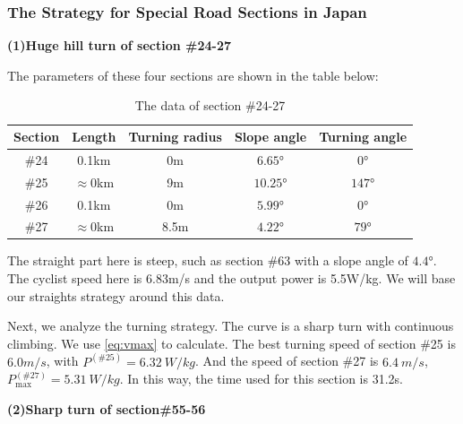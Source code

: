 \documentclass{mcmthesis}
\begin{document}
\subsubsection{The Strategy for Special Road Sections in Japan}
\label{sec:special-road-japan}
\textbf{(1)Huge hill turn of section \#24-27}


The parameters of these four sections are shown in the table below:
\begin{table}[H]
\centering
\caption{The data of section \#24-27}
\vspace{-0.4cm}
\begin{tabular}{ccccc}
\hline
Section & Length & Turning radius & Slope angle & Turning angle \\
\hline
\#24 & 0.1km & 0m & $6.65°$ & $0°$ \\
\#25 & $\approx 0$km & 9m & $10.25°$ & $147°$ \\
\#26 & 0.1km & 0m & $5.99°$ & $0°$ \\
\#27 & $\approx 0$km & 8.5m & $4.22°$ & $79°$ \\
\hline
\end{tabular}
\end{table}
\vspace{-0.4cm}
The straight part here is steep, such as section \#63 with a slope angle of $4.4°$. The cyclist speed here is 6.83m/s and the output power is 5.5W/kg. We will base our straights strategy around this data.

Next, we analyze the turning strategy. 
The curve is a sharp turn with continuous climbing.
 We use \autoref{eq:vmax} to calculate. 
 The best turning speed of section \#25 is $6.0m/s$, with $P^{(\#25)} = 6.32\ W/kg$. And the speed of section \#27 is $6.4\ m/s$, $P_{\max}^{(\#27)} = 5.31\ W/kg$. In this way, the time used for this section is 31.2s.

\noindent\textbf{(2)Sharp turn of section\#55-56}
\end{document}

